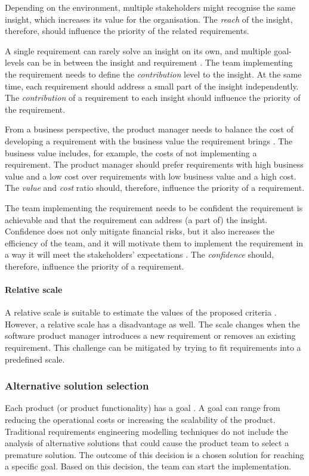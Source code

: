 Depending on the environment, multiple stakeholders might recognise the same insight, which increases its value for the organisation. The \emph{reach} of the insight, therefore, should influence the priority of the related requirements.

A single requirement can rarely solve an insight on its own, and multiple goal-levels can be in between the insight and requirement \parencite{BK04}. The team implementing the requirement needs to define the \emph{contribution} level to the insight. At the same time, each requirement should address a small part of the insight independently. The \emph{contribution} of a requirement to each insight should influence the priority of the requirement.

From a business perspective, the product manager needs to balance the cost of developing a requirement with the business value the requirement brings \parencite{BK04}. The business value includes, for example, the costs of not implementing a requirement. The product manager should prefer requirements with high business value and a low cost over requirements with low business value and a high cost. The \emph{value} and \emph{cost} ratio should, therefore, influence the priority of a requirement.

The team implementing the requirement needs to be confident the requirement is achievable and that the requirement can address (a part of) the insight. Confidence does not only mitigate financial risks, but it also increases the efficiency of the team, and it will motivate them to implement the requirement in a way it will meet the stakeholders' expectations \parencite{PM23}. The \emph{confidence} should, therefore, influence the priority of a requirement.

\paragraph{Relative scale}
A relative scale is suitable to estimate the values of the proposed criteria \parencite{PM22}. However, a relative scale has a disadvantage as well. The scale changes when the software product manager introduces a new requirement or removes an existing requirement. This challenge can be mitigated by trying to fit requirements into a predefined scale.

\subsubsection{Alternative solution selection} \label{tf-val-as}
Each product (or product functionality) has a goal \parencite{SO03}. A goal can range from reducing the operational costs or increasing the scalability of the product. Traditional requirements engineering modelling techniques do not include the analysis of alternative solutions \parencite{SO12} that could cause the product team to select a premature solution. The outcome of this decision is a chosen solution for reaching a specific goal. Based on this decision, the team can start the implementation.

